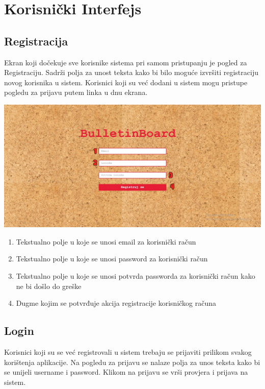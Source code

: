 \section{Korisnički Interfejs}

\subsection{Registracija}
Ekran koji dočekuje sve korisnike sistema pri samom pristupanju je pogled za Registraciju. Sadrži polja za unost teksta kako bi bilo moguće izvršiti registraciju novog korisnika u sistem. Korisnici koji su već dodani u sistem mogu pristupe pogledu za prijavu putem linka u dnu ekrana.


\centerline{\includegraphics[scale=0.5]{slike/registracija_no.jpg}}
\begin{enumerate}
    \item Tekstualno polje u koje se unosi email za korisnički račun
    \item Tekstualno polje u koje se unosi password za korisnički račun
    \item Tekstualno polje u koje se unosi potvrda passworda za korisnički račun kako ne bi došlo do greške
    \item Dugme kojim se potvrđuje akcija registracije korisničkog računa
\end{enumerate}


\newpage

\subsection{Login}
Korisnici koji su se već registrovali u sistem trebaju se prijaviti prilikom svakog korištenja aplikacije. Na pogledu za prijavu se nalaze polja za unos teksta kako bi se unijeli username i password. Klikom na prijavu se vrši provjera i prijava na sistem.


